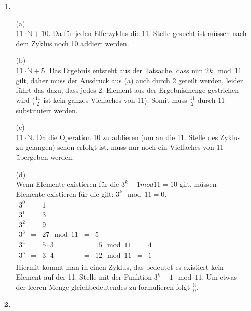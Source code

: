 \documentclass[a4paper,11pt,fleqn]{scrartcl}
\title{\titleinfo}
\author{\authorinfo}
\begin{document}
	\maketitle
	\begin{enumerate}
		\item[\textbf{1.}]
		\begin{enumerate}
			\item[(a)]\quad \\
				\(11 \cdot \mathbb{N} + 10\). Da für jeden Elferzyklus die 11. Stelle gesucht ist müssen nach dem Zyklus noch 10 
				addiert werden.
			\item[(b)]\quad \\
				\(11 \cdot \mathbb{N} + 5\). Das Ergebnis entsteht aus der Tatsache, dass nun \(2k \mod 11\) gilt, daher muss
				der Ausdruck aus (a) auch durch 2 geteilt werden, leider führt das dazu, dass jedes 2. Element aus der 
				Ergebnismenge gestrichen wird (\(\frac{11}{2}\) ist kein ganzes Vielfaches von 11). Somit muss \(\frac{11}{2}\) 
				durch \(11\) substituiert werden.
			\item[(c)]\quad \\
				\(11 \cdot \mathbb{N}\). Da die Operation 10 zu addieren (um an die 11. Stelle des Zyklus zu gelangen) schon 
				erfolgt ist, muss nur noch ein Vielfaches von 11 übergeben werden.
			\item[(d)]\quad \\
				Wenn Elemente existieren für die \(3^k - 1 mod 11 = 10\) gilt, müssen Elemente existieren für die gilt: 
				\(3^k \mod 11 = 0\). \\
				\(
				\begin{array}{rclclcl}
					3^0 &=& 1 \\
					3^1 &=& 3 \\
					3^2 &=& 9 \\
					3^3 &=& 27 \mod 11 &=& 5 \\
					3^4 &=& 5 \cdot 3 &=& 15 \mod 11 &=& 4 \\
					3^5 &=& 3 \cdot 4 &=& 12 \mod 11 &=& 1 \\
				\end{array}
				\) \\
				Hiermit kommt man in einen Zyklus, das bedeutet es existiert kein Element auf der 11. Stelle mit der Funktion
				\(3^k - 1 \mod 11\). Um etwas der leeren Menge gleichbedeutendes zu formulieren folgt \(\frac{\mathbb{N}}{0}\).
		\end{enumerate}
		\item[\textbf{2.}]\quad \\

\end{enumerate}
\end{document}
